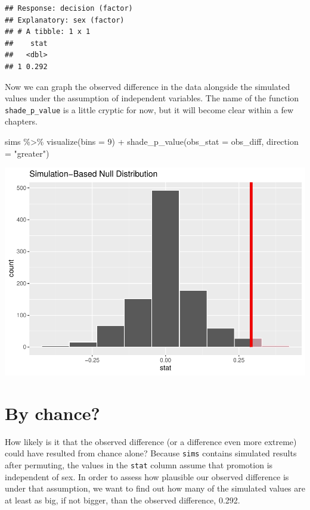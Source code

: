 \documentclass[
]{book}
\newenvironment{Shaded}{\begin{snugshade}}{\end{snugshade}}
\newcommand{\AttributeTok}[1]{\textcolor[rgb]{0.77,0.63,0.00}{#1}}
\newcommand{\DecValTok}[1]{\textcolor[rgb]{0.00,0.00,0.81}{#1}}
\newcommand{\FunctionTok}[1]{\textcolor[rgb]{0.00,0.00,0.00}{#1}}
\newcommand{\NormalTok}[1]{#1}
\newcommand{\SpecialCharTok}[1]{\textcolor[rgb]{0.00,0.00,0.00}{#1}}
\newcommand{\StringTok}[1]{\textcolor[rgb]{0.31,0.60,0.02}{#1}}
\begin{document}
\begin{verbatim}
## Response: decision (factor)
## Explanatory: sex (factor)
## # A tibble: 1 x 1
##    stat
##   <dbl>
## 1 0.292
\end{verbatim}

Now we can graph the observed difference in the data alongside the simulated values under the assumption of independent variables. The name of the function \texttt{shade\_p\_value} is a little cryptic for now, but it will become clear within a few chapters.

\begin{Shaded}
\begin{Highlighting}[]
\NormalTok{sims }\SpecialCharTok{\%\textgreater{}\%}
    \FunctionTok{visualize}\NormalTok{(}\AttributeTok{bins =} \DecValTok{9}\NormalTok{) }\SpecialCharTok{+}
    \FunctionTok{shade\_p\_value}\NormalTok{(}\AttributeTok{obs\_stat =}\NormalTok{ obs\_diff, }\AttributeTok{direction =} \StringTok{"greater"}\NormalTok{)}
\end{Highlighting}
\end{Shaded}

\includegraphics{intro_stats_files/figure-latex/unnamed-chunk-257-1.pdf}

\hypertarget{randomization2-chance}{%
\section{By chance?}\label{randomization2-chance}}

How likely is it that the observed difference (or a difference even more extreme) could have resulted from chance alone? Because \texttt{sims} contains simulated results after permuting, the values in the \texttt{stat} column assume that promotion is independent of sex. In order to assess how plausible our observed difference is under that assumption, we want to find out how many of the simulated values are at least as big, if not bigger, than the observed difference, 0.292.
\end{document}
